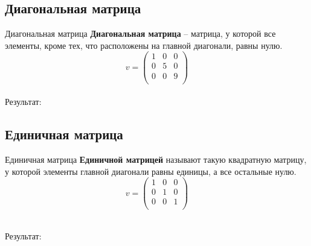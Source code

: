 \documentclass[12pt]{beamer}
\begin{document}
\subsection{Диагональная матрица}
\begin{frame}{Диагональная матрица}
\textbf{Диагональная матрица} – матрица, у которой все элементы, кроме тех, что расположены на главной диагонали, равны нулю.
\vspace{0.2cm}
\[
  v = 
  \begin{pmatrix}
    1 & 0 & 0 \\
    0 & 5 & 0 \\
    0 & 0 & 9 \\
  \end{pmatrix}
\]
\\

Результат: \\

\end{frame}

\subsection{Единичная матрица}
\begin{frame}{Единичная матрица}
\textbf{Единичной матрицей} называют такую квадратную матрицу, у которой элементы главной диагонали равны единицы, а все остальные нулю.
\vspace{0.2cm}
\[
  v = 
  \begin{pmatrix}
    1 & 0 & 0 \\
    0 & 1 & 0 \\
    0 & 0 & 1 \\
  \end{pmatrix}
\]
\\
\vspace{-0.6cm}

Результат: \\

\end{frame}
\end{document}
